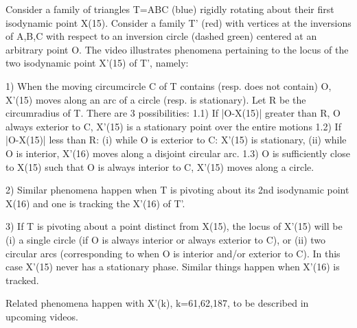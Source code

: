 Consider a family of triangles T=ABC (blue) rigidly rotating about their first isodynamic point X(15). Consider a family T' (red) with vertices at the inversions of A,B,C with respect to an inversion circle (dashed green) centered at an arbitrary point O. The video illustrates phenomena pertaining to the locus of the two isodynamic point X'(15) of T', namely:

1) When the moving circumcircle C of T contains (resp. does not contain) O, X'(15) moves along an arc of a circle (resp. is stationary). Let R be the circumradius of T. There are 3 possibilities:
1.1) If |O-X(15)|  greater than R, O always exterior to C, X'(15) is a stationary point over the entire motions
1.2) If |O-X(15)|  less than R: (i) while O is exterior to C: X'(15) is stationary, (ii) while O is interior, X'(16) moves along a disjoint circular arc.
1.3) O is sufficiently close to X(15) such that O is always interior to C, X'(15) moves along a circle.

2) Similar phenomena happen when T is pivoting about its 2nd isodynamic point X(16) and one is tracking the X'(16) of T'.

3) If T is pivoting about a point distinct from X(15), the locus of X'(15) will be (i) a single circle (if O is always interior or always exterior to C), or (ii) two circular arcs (corresponding to when O is interior and/or exterior to C). In this case X'(15) never has a stationary phase. Similar things happen when X'(16) is tracked.

Related phenomena happen with X'(k), k=61,62,187, to be described in upcoming videos.